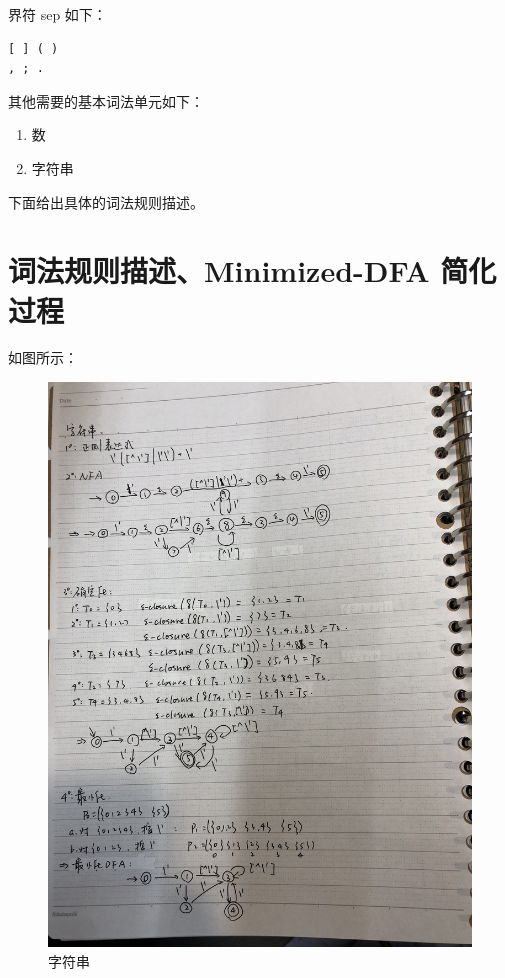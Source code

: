 \documentclass[lang=cn]{elegantpaper}
\begin{document}
界符 sep 如下：
\begin{lstlisting}[language=pascal]
[ ] ( )
, ; .
\end{lstlisting}

其他需要的基本词法单元如下：
\begin{enumerate}
    \item 数
    \item 字符串
\end{enumerate}

下面给出具体的词法规则描述。

\section{词法规则描述、Minimized-DFA 简化过程}

如图所示：
\begin{figure}
	\centering
	\includegraphics[width=0.7\linewidth]{img/IMG_3153}
	\caption{字符串}
	\label{fig:img3153}
\end{figure}
\end{document}
